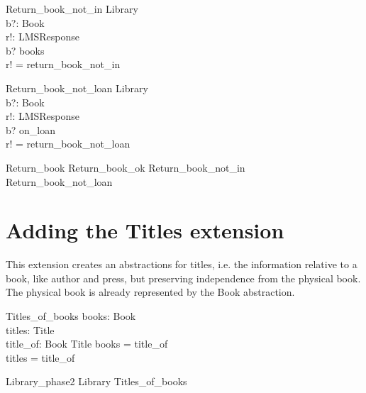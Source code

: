 \documentclass[11pt, fuzz]{article}
\begin{document}
\begin{schema}{Return\_book\_not\_in}
    \Xi Library     \\
    b?: Book        \\
    r!: LMSResponse \\
\where
    b? \notin books                        \\
    r! = return\_book\_not\_in              \\
\end{schema}

\begin{schema}{Return\_book\_not\_loan}
    \Xi Library     \\
    b?: Book        \\
    r!: LMSResponse \\
\where
    b? \notin on\_loan          \\
    r! = return\_book\_not\_loan \\
\end{schema}

\begin{zed}
    Return\_book  Return\_book\_ok \lor Return\_book\_not\_in \lor \\ Return\_book\_not\_loan
\end{zed}


\section{Adding the Titles extension}

This extension creates an abstractions for titles, i.e. the information relative to a book, like author and press, but preserving independence from the physical book. The physical book is already represented by the Book abstraction. 

\begin{zed}
    [Title]
\end{zed}

\begin{schema}{Titles\_of\_books}
    books: \power Book          \\
    titles: \power Title        \\
    title\_of: Book \pfun Title 
\where
    books = \dom title\_of \\
    titles = \ran title\_of \\
\end{schema}

\begin{zed}
    Library\_phase2  Library \land Titles\_of\_books
\end{zed}
\end{document}
